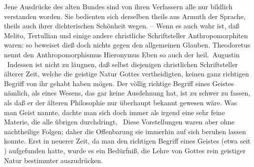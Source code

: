 \begin{aufza}
\item[\RWbet{Antwort.}] Jene Ausdrücke des alten Bundes sind von ihren Verfassern alle nur bildlich verstanden worden. Sie bedienten sich derselben theils aus Armuth der Sprache, theils auch ihrer dichterischen Schönheit wegen. -- Wenn es auch wahr ist, daß Melito, Tertullian und einige andere christliche Schriftsteller Anthropomorphiten waren: so beweiset dieß doch nichts gegen den allgemeinen Glauben. Theodoretus nennt den Anthropomorphismus  Hieronymus  Eben so auch der heil.\ Augustin \uA\ Indessen ist nicht zu läugnen, daß selbst diejenigen christlichen Schriftsteller älterer Zeit, welche die geistige Natur Gottes vertheidigten, keinen ganz richtigen Begriff von ihr gehabt haben mögen. Der völlig richtige Begriff eines Geistes nämlich, als eines Wesens, das gar keine Ausdehnung hat, ist zu schwer zu fassen, als daß er der älteren Philosophie nur überhaupt bekannt gewesen wäre. Was man Geist nannte, dachte man sich doch immer als irgend eine sehr feine Materie, die alle übrigen durchdringt, \udgl\  Diese Vorstellungen waren aber ohne nachtheilige Folgen; daher die Offenbarung sie immerhin auf sich beruhen lassen konnte. Erst in neuerer Zeit, da man den richtigen Begriff eines Geistes (etwa seit ) aufgefunden hatte, wurde es ein Bedürfniß, die Lehre von Gottes rein geistiger Natur bestimmter auszudrücken.
\end{aufza}

